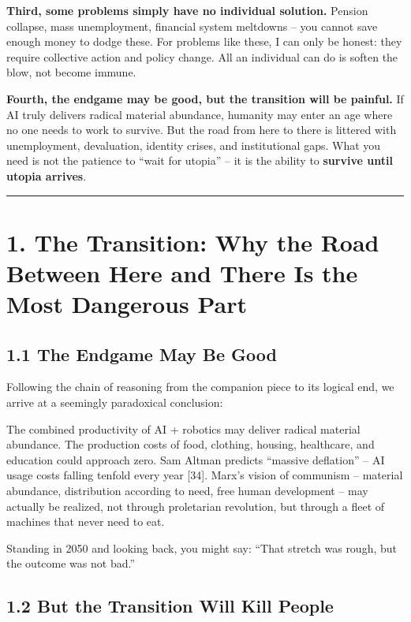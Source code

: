 \textbf{Third, some problems simply have no individual solution.}
Pension collapse, mass unemployment, financial system meltdowns -- you
cannot save enough money to dodge these. For problems like these, I can
only be honest: they require collective action and policy change. All an
individual can do is soften the blow, not become immune.

\textbf{Fourth, the endgame may be good, but the transition will be
painful.} If AI truly delivers radical material abundance, humanity may
enter an age where no one needs to work to survive. But the road from
here to there is littered with unemployment, devaluation, identity
crises, and institutional gaps. What you need is not the patience to
``wait for utopia'' -- it is the ability to \textbf{survive until utopia
arrives}.

\begin{center}\rule{0.5\linewidth}{0.5pt}\end{center}

\section{1. The Transition: Why the Road Between Here and There Is the
Most Dangerous
Part}\label{the-transition-why-the-road-between-here-and-there-is-the-most-dangerous-part}

\subsection{1.1 The Endgame May Be Good}\label{the-endgame-may-be-good}

Following the chain of reasoning from the companion piece to its logical
end, we arrive at a seemingly paradoxical conclusion:

The combined productivity of AI + robotics may deliver radical material
abundance. The production costs of food, clothing, housing, healthcare,
and education could approach zero. Sam Altman predicts ``massive
deflation'' -- AI usage costs falling tenfold every year {[}34{]}.
Marx's vision of communism -- material abundance, distribution according
to need, free human development -- may actually be realized, not through
proletarian revolution, but through a fleet of machines that never need
to eat.

Standing in 2050 and looking back, you might say: ``That stretch was
rough, but the outcome was not bad.''

\subsection{1.2 But the Transition Will Kill
People}\label{but-the-transition-will-kill-people}

